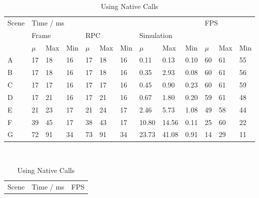 \begin{table}[h]
    \begin{subtable}[h]{\textwidth}
        \centering
\begin{tabular}{l|lll|lll|lll|lll}
\multirow{3}{*}{Scene} & \multicolumn{9}{l|}{Time / ms}                                                          & \multicolumn{3}{l|}{\multirow{2}{*}{FPS}} \\ \cline{2-10}
                       & \multicolumn{3}{l|}{Frame} & \multicolumn{3}{l|}{RPC} & \multicolumn{3}{l|}{Simulation} & \multicolumn{3}{l|}{}                     \\ \cline{2-13} 
                       & $\mu$     & Max     & Min     & $\mu$     & Max    & Min    & $\mu$       & Max       & Min      & $\mu$          & Max          & Min          \\ \hline
A                      & 17       & 18     & 16     & 17       & 18    & 16    & 0.11       & 0.13     & 0.10    & 60            & 61          & 55          \\
B                      & 17       & 18     & 16     & 17       & 18    & 16    & 0.35       & 2.93     & 0.08    & 60            & 61          & 56          \\
C                      & 17       & 17     & 16     & 17       & 17    & 16    & 0.45       & 0.90     & 0.23    & 60            & 61          & 59          \\
D                      & 17       & 21     & 16     & 17       & 21    & 16    & 0.67       & 1.80     & 0.20    & 59            & 61          & 48          \\
E                      & 21       & 23     & 17     & 21       & 24    & 17    & 2.46       & 5.73     & 1.08    & 49            & 58          & 44          \\
F                      & 39       & 45     & 17     & 38       & 43    & 17    & 10.80      & 14.56    & 0.11    & 25            & 60          & 22          \\
G                      & 72       & 91     & 34     & 73       & 91    & 34    & 23.73      & 41.08    & 0.91    & 14            & 29          & 11         
\end{tabular}
        \caption{Using Native Calls}
    \end{subtable}
    ~
    \begin{subtable}[h]{\textwidth}
        \centering
\begin{tabular}{l|lll|lll|lll|lll}
\multirow{3}{*}{Scene} & \multicolumn{9}{l|}{Time / ms}                                                          & \multicolumn{3}{l|}{\multirow{2}{*}{FPS}} \\ \cline{2-10}

\end{tabular}
\end{subtable}
\end{table}
